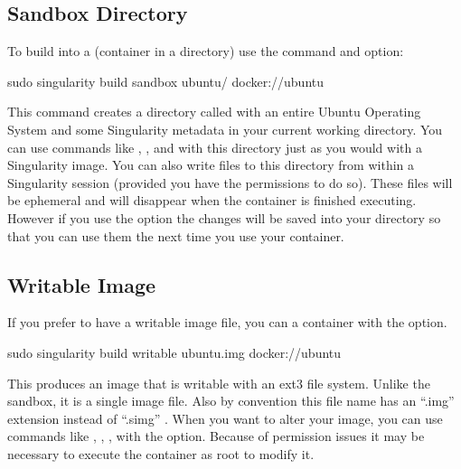 \documentclass[letterpaper,10pt,english]{sphinxmanual}
\begin{document}
\subsection{Sandbox Directory}
\label{\detokenize{quick_start:sandbox-directory}}
To build into a  (container in a directory) use the  command and option:

%
\begin{sphinxVerbatim}[commandchars=\\\{\}]
\PYGZdl{} sudo singularity build \PYGZhy{}\PYGZhy{}sandbox ubuntu/ docker://ubuntu
\end{sphinxVerbatim}

This command creates a directory called  with an entire Ubuntu
Operating System and some Singularity metadata in your current working
directory.
You can use commands like ,  , and  with this directory just as you
would with a Singularity image. You can also write files to this
directory from within a Singularity session (provided you have the
permissions to do so). These files will be ephemeral and will
disappear when the container is finished executing. However if you use
the  option the changes will be saved into your directory so that you
can use them the next time you use your container.


\subsection{Writable Image}
\label{\detokenize{quick_start:writable-image}}
If you prefer to have a writable image file, you can  a container with
the  option.

%
\begin{sphinxVerbatim}[commandchars=\\\{\}]
\PYGZdl{} sudo singularity build \PYGZhy{}\PYGZhy{}writable ubuntu.img docker://ubuntu
\end{sphinxVerbatim}

This produces an image that is writable with an ext3 file system.
Unlike the sandbox, it is a single image file. Also by convention this
file name has an “.img” extension instead of “.simg” .
When you want to alter your image, you can use commands like , , ,
with the  option. Because of permission issues it may be necessary to
execute the container as root to modify it.
\end{document}
